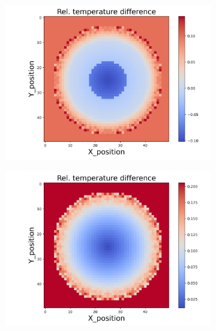 \begin{figure}[h]
    \begin{minipage}{\textwidth}
        \centering
        \begin{subfigure}{0.325\textwidth}
            \centering
            \includegraphics[width=\textwidth]{figures/raw_data/25/mix/T_bias.jpg}
        \end{subfigure}
        \begin{subfigure}{0.325\textwidth}
            \centering
            \includegraphics[width=\textwidth]{figures/raw_data/26/mix/T_bias.jpg}
        \end{subfigure}
        \begin{subfigure}{0.325\textwidth}

\end{subfigure}
\end{minipage}
\end{figure}
